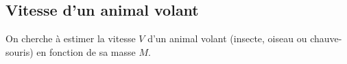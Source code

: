  





\subsection{Vitesse d'un animal volant}

On cherche à estimer la vitesse $V$ d'un animal volant (insecte, oiseau ou chauve-souris) en fonction de sa masse $M$.




